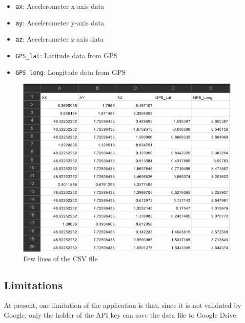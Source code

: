 \begin{itemize}
    \item \texttt{ax}: Accelerometer x-axis data
    \item \texttt{ay}: Accelerometer y-axis data
    \item \texttt{az}: Accelerometer z-axis data
    \item \texttt{GPS\_lat}: Latitude data from GPS
    \item \texttt{GPS\_long}: Longitude data from GPS
\end{itemize}

\begin{figure}[H]
    \centering
    \includegraphics[width=0.5\linewidth]{csv.png}
    \caption{Few lines of the CSV file}
    \label{fig:enter-label}
\end{figure}

\subsection*{Limitations}
At present, one limitation of the application is that, since it is not validated by Google, only the holder of the API key can save the data file to Google Drive.

